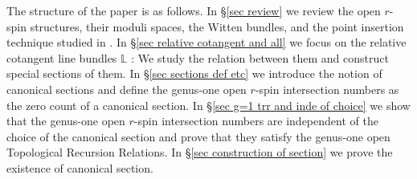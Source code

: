 \documentclass[11pt]{amsart}
\theoremstyle{definition}
\theoremstyle{remark}
\newcommand{\<}{\left<}
\renewcommand{\>}{\right>}
\numberwithin{equation}{section}
\begin{document}
The structure of the paper is as follows. In \S\ref{sec review} we review the open $r$-spin structures, their moduli spaces, the Witten %
bundles, and the point insertion technique studied in \cite{BCT1,TZ1}. In \S \ref{sec relative  cotangent and all} we focus on the %
relative cotangent line bundles $\mathbb L$%
: We study %
the relation between them and construct special sections of them. In \S \ref{sec sections def etc} we introduce the notion of canonical sections and define the genus-one open $r$-spin intersection numbers as the zero count of a canonical section. In \S \ref{sec g=1 trr  and inde of choice} we show that the genus-one open $r$-spin intersection numbers are independent of the choice of the %
canonical section and %
prove that they satisfy the genus-one %
open Topological Recursion Relations. In %
\S\ref{sec construction of section} we prove the existence of canonical %
section.
\end{document}
